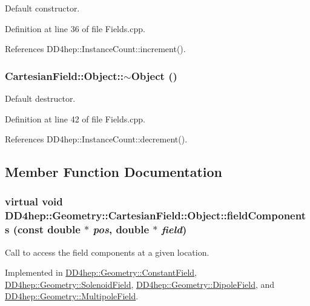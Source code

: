 Default constructor. 

Definition at line 36 of file Fields.cpp.

References DD4hep::InstanceCount::increment().\hypertarget{class_d_d4hep_1_1_geometry_1_1_cartesian_field_1_1_object_a8bc1219e4d9ef209dd929f96c7dfd5b4}{
\subsubsection[{$\sim$Object}]{\setlength{\rightskip}{0pt plus 5cm}CartesianField::Object::$\sim$Object ()}}
\label{class_d_d4hep_1_1_geometry_1_1_cartesian_field_1_1_object_a8bc1219e4d9ef209dd929f96c7dfd5b4}


Default destructor. 

Definition at line 42 of file Fields.cpp.

References DD4hep::InstanceCount::decrement().

\subsection{Member Function Documentation}
\hypertarget{class_d_d4hep_1_1_geometry_1_1_cartesian_field_1_1_object_ab3fa7f39545c8b0f769ee1ddfd03ed90}{
\subsubsection[{fieldComponents}]{\setlength{\rightskip}{0pt plus 5cm}virtual void DD4hep::Geometry::CartesianField::Object::fieldComponents (const double $\ast$ {\em pos}, \/  double $\ast$ {\em field})}}
\label{class_d_d4hep_1_1_geometry_1_1_cartesian_field_1_1_object_ab3fa7f39545c8b0f769ee1ddfd03ed90}


Call to access the field components at a given location. 

Implemented in \hyperlink{class_d_d4hep_1_1_geometry_1_1_constant_field_a512fc8911c0c3e710b363c455c2c9ea9}{DD4hep::Geometry::ConstantField}, \hyperlink{class_d_d4hep_1_1_geometry_1_1_solenoid_field_aef35ec6873e2227025d3b770bdbdc1e1}{DD4hep::Geometry::SolenoidField}, \hyperlink{class_d_d4hep_1_1_geometry_1_1_dipole_field_afee57d23345cdd6a457475d8fe6ac4a7}{DD4hep::Geometry::DipoleField}, and \hyperlink{class_d_d4hep_1_1_geometry_1_1_multipole_field_a06782e6f0fbdfcf53394ee5dda83b052}{DD4hep::Geometry::MultipoleField}.

